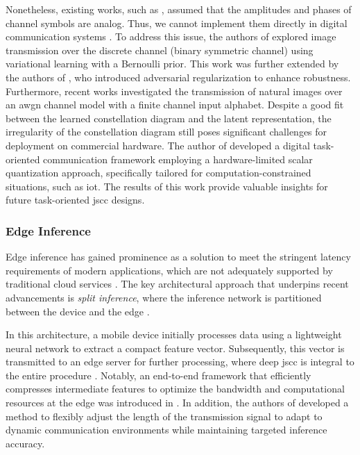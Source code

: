 Nonetheless, existing works, such as \cite{Shao_2023_SCW}, assumed that the amplitudes and phases of channel symbols are analog. Thus, we cannot implement them directly in digital communication systems \cite{_2020_ISf}. To address this issue, the authors of \cite{Choi_2019_NJS} explored image transmission over the discrete channel (binary symmetric channel) using variational learning with a Bernoulli prior. This work was further extended by the authors of \cite{Song_2020_Inj}, who introduced adversarial regularization to enhance robustness. Furthermore, recent works \cite{Tung_2022_DQC, Tung_2022_DQCa} investigated the transmission of natural images over an \gls{awgn} channel model with a finite channel input alphabet. Despite a good fit between the learned constellation diagram and the latent representation, the irregularity of the constellation diagram still poses significant challenges for deployment on commercial hardware. The author of \cite{Hu_2024_DTO} developed a digital task-oriented communication framework employing a hardware-limited scalar quantization approach, specifically tailored for computation-constrained situations, such as \gls{iot}. The results of this work provide valuable insights for future task-oriented \gls{jscc} designs.


\subsubsection{Edge Inference}
Edge inference has gained prominence as a solution to meet the stringent latency requirements of modern applications, which are not adequately supported by traditional cloud services \cite{Shi_2020_CEE, Li_2018_EIO}. The key architectural approach that underpins recent advancements is \textit{split inference}, where the inference network is partitioned between the device and the edge \cite{Huang_2020_DCR, Shi_2019_IDE, Li_2020_EAO, Shao_2020_CCT, Shao_2020_BAE, Jankowski_2020_JDE, Jankowski_2021_WIR, Shao_2022_LTO, Shao_2023_TOC}.

In this architecture, a mobile device initially processes data using a lightweight neural network to extract a compact feature vector. Subsequently, this vector is transmitted to an edge server for further processing, where deep \gls{jscc} is integral to the entire procedure \cite{Shao_2020_CCT, Shao_2020_BAE, Jankowski_2020_JDE, Jankowski_2021_WIR, Shao_2022_LTO, Shao_2023_TOC}. Notably, an end-to-end framework that efficiently compresses intermediate features to optimize the bandwidth and computational resources at the edge was introduced in \cite{Shao_2020_BAE}. In addition, the authors of \cite{Shao_2022_LTO} developed a method to flexibly adjust the length of the transmission signal to adapt to dynamic communication environments while maintaining targeted inference accuracy.

